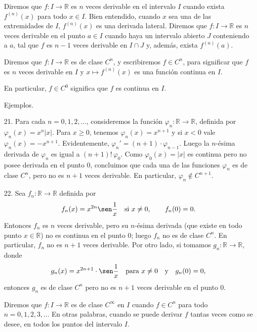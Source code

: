 \documentclass[12pt,oneside]{book}
\begin{document}
Diremos que \( f: I \to \mathbb{R} \) es \( n \) veces derivable en el intervalo \( I \) cuando exista \( f^{(n)}(x) \) para todo \( x \in I \). Bien entendido, cuando \( x \) sea una de las extremidades de \( I \), \( f^{(n)}(x) \) es una derivada lateral. Diremos que \( f: I \to \mathbb{R} \) es \( n \) veces derivable en el punto \( a \in I \) cuando haya un intervalo abierto \( J \) conteniendo a \( a \), tal que \( f \) es \( n-1 \) veces derivable en \( I \cap J \) y, además, exista \( f^{(n)}(a) \).

Diremos que \( f: I \to \mathbb{R} \) es de clase \( C^n \), y escribiremos \( f \in C^n \), para significar que \( f \) es \( n \) veces derivable en \( I \) y \( x \mapsto f^{(n)}(x) \) es una función continua en \( I \).

En particular, \( f \in C^0 \) significa que \( f \) es continua en \( I \).

Ejemplos.

21. Para cada \( n = 0, 1, 2, \dots \), consideremos la función \( \varphi_n: \mathbb{R} \to \mathbb{R} \), definida por \( \varphi_n(x) = x^n |x| \). Para \( x \geq 0 \), tenemos \( \varphi_n(x) = x^{n+1} \) y si \( x < 0 \) vale \( \varphi_n(x) = -x^{n+1} \). Evidentemente, \( \varphi_n' = (n+1) \cdot \varphi_{n-1} \). Luego la \( n \)-ésima derivada de \( \varphi_n \) es igual a \( (n+1)! \, \varphi_0 \). Como \( \varphi_0(x) = |x| \) es continua pero no posee derivada en el punto \( 0 \), concluimos que cada una de las funciones \( \varphi_n \) es de clase \( C^n \), pero no es \( n+1 \) veces derivable. En particular, \( \varphi_n \notin C^{n+1} \).

22. Sea \( f_n: \mathbb{R} \to \mathbb{R} \) definida por
\[
f_n(x) = x^{2n} \sen \frac{1}{x} \quad \text{si } x \neq 0, \qquad f_n(0) = 0.
\]
Entonces \( f_n \) es \( n \) veces derivable, pero su \( n \)-ésima derivada (que existe en todo punto \( x \in \mathbb{R} \)) no es continua en el punto \( 0 \); luego \( f_n \) no es de clase \( C^n \). En particular, \( f_n \) no es \( n+1 \) veces derivable. Por otro lado, si tomamos \( g_n: \mathbb{R} \to \mathbb{R} \), donde
\[
g_n(x) = x^{2n+1} \cdot \sen \frac{1}{x} \quad \text{para } x \neq 0 \quad \text{y} \quad g_n(0) = 0,
\]
entonces \( g_n \) es de clase \( C^n \) pero no es \( n+1 \) veces derivable en el punto \( 0 \).

Diremos que \( f: I \to \mathbb{R} \) es de clase \( C^\infty \) en \( I \) cuando \( f \in C^n \) para todo \( n = 0, 1, 2, 3, \dots \) En otras palabras, cuando se puede derivar \( f \) tantas veces como se desee, en todos los puntos del intervalo \( I \).
\end{document}
